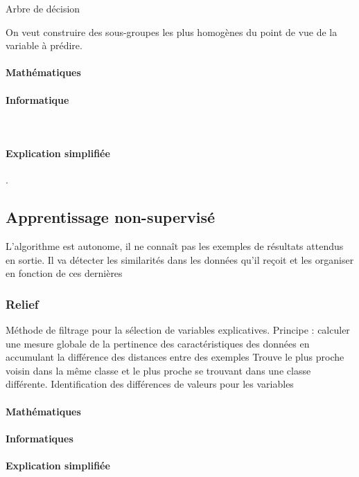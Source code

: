 \documentclass[12pt]{article}
\begin{document}
Arbre de décision

On veut construire des sous-groupes les plus homogènes du point de vue de la variable à prédire.

\paragraph{Mathématiques}
 
\paragraph{Informatique}\mbox{}\\

\paragraph{Explication simplifiée}. 

\subsection{Apprentissage non-supervisé}

L’algorithme est autonome, il ne connaît pas les exemples de résultats attendus en sortie. Il va détecter les similarités dans les données qu’il reçoit et les organiser en fonction de ces
dernières

\subsubsection{Relief}

Méthode de filtrage pour la sélection de variables explicatives. Principe : calculer une mesure globale de la pertinence des caractéristiques des données en accumulant la
différence des distances entre des exemples
Trouve le plus proche voisin dans la même classe et le plus proche se trouvant dans une classe différente. Identification des différences de valeurs pour les variables

\paragraph{Mathématiques}
\paragraph{Informatiques}
\paragraph{Explication simplifiée}
\end{document}
